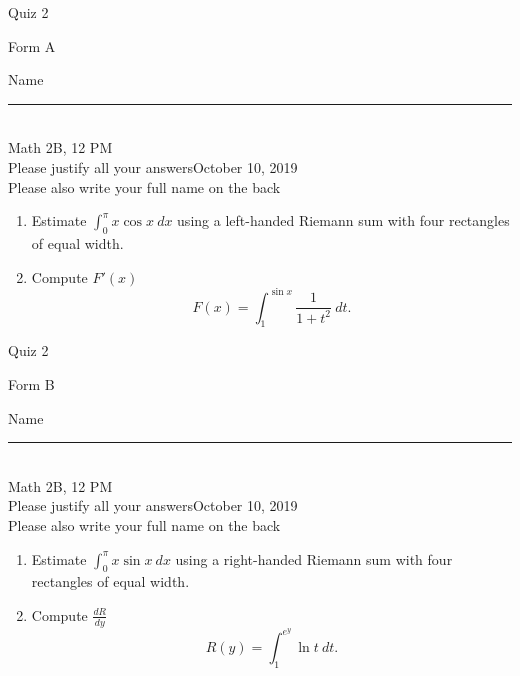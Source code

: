 \documentclass[12pt]{article}
\begin{document}
\begin{flushleft} 
\centerline{\LARGE{Quiz 2}} 
\vspace{5 mm}
{Form A}\hfill  
{Name \rule {2 in}{0.01in}}\\
Math 2B, 12 PM
\\
{Please justify all your answers}\hfill {October 10, 2019}
\\
{Please also write your full name on the back} 

\medskip
\end{flushleft}

\begin{enumerate}
	\item Estimate $\int_0^\pi x\cos x\ dx$ using a left-handed Riemann sum with four rectangles of equal width.
	\vfill

	\item Compute $F'(x)$
	\[
	F(x) = \int_1^{\sin x}\frac{1}{1+t^2}\ dt.
	\]

	\vfill\null
\end{enumerate}
\pagebreak


\begin{flushleft} 
\centerline{\LARGE{Quiz 2}} 
\vspace{5 mm}
{Form B}\hfill  
{Name \rule {2 in}{0.01in}}\\
Math 2B, 12 PM
\\
{Please justify all your answers}\hfill {October 10, 2019}
\\
{Please also write your full name on the back} 

\medskip
\end{flushleft}

\begin{enumerate}
	\item Estimate $\int_0^\pi x\sin x\ dx$ using a right-handed Riemann sum with four rectangles of equal width.
	\vfill

	\item Compute $\frac{dR}{dy}$
	\[
	R(y) = \int_1^{e^y}\ln t\ dt.
	\]

	\vfill\null
\end{enumerate}

\end{document}
